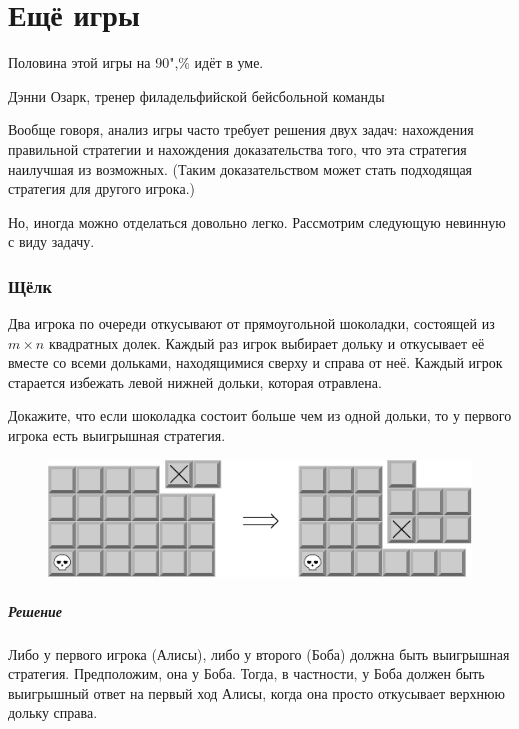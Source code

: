 \documentclass[twoside]{book}
\makeatletter
\newcommand{\rindex}[2][\imki@jobname]{%
  \index[#1]{\detokenize{#2}}%
}
\makeatother
\begin{document}
\chapter{Ещё игры}


\setlength{\epigraphwidth}{.5\textwidth}
\epigraph{Половина этой игры на 90",\% идёт в уме.\vspace{1ex}}{Дэнни Озарк, тренер филадельфийской бейсбольной команды}

Вообще говоря, анализ игры часто требует решения двух задач: нахождения правильной стратегии и нахождения доказательства того, что эта стратегия наилучшая из возможных.
(Таким доказательством может стать подходящая стратегия для другого игрока.)

Но, иногда можно отделаться довольно легко.
Рассмотрим следующую невинную с виду задачу.

\subsection*{Щёлк}%
\rindex{Щёлк}

Два игрока по очереди откусывают от прямоугольной шоколадки, состоящей из $m \times n$ квадратных долек.
Каждый раз игрок выбирает дольку и откусывает её вместе со всеми дольками, находящимися сверху и справа от неё.
Каждый игрок старается избежать левой нижней дольки, которая отравлена.

Докажите, что если шоколадка состоит больше чем из одной дольки, то у первого игрока есть выигрышная стратегия.

\begin{figure}[h]
\centering
\includegraphics{mp/wink-23}
\end{figure}

\paragraph{Решение} Либо у первого игрока (Алисы), либо у второго (Боба) должна быть выигрышная стратегия.
Предположим, она у Боба.
Тогда, в частности, у Боба должен быть выигрышный ответ на первый ход Алисы, когда она просто откусывает верхнюю дольку справа.
\end{document}
